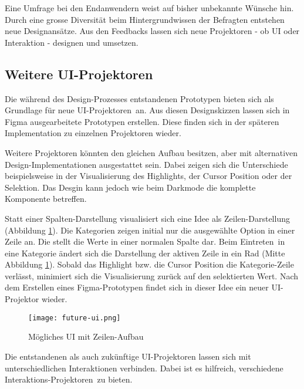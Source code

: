 Eine Umfrage bei den Endanwendern weist auf bisher unbekannte Wünsche hin. 
Durch eine grosse Diversität beim Hintergrundwissen der Befragten entstehen neue Designansätze.
Aus den Feedbacks lassen sich neue Projektoren - ob UI oder Interaktion - designen und umsetzen.


\subsection{Weitere UI-Projektoren}
\label{sec:moreUi}

Die während des Design-Prozesses entstandenen Prototypen bieten sich als Grundlage für neue UI-Projektoren\footnotemark \ an.
Aus diesen Designskizzen lassen sich in Figma ausgearbeitete Prototypen erstellen.
Diese finden sich in der späteren Implementation zu einzelnen Projektoren wieder.

Weitere Projektoren könnten den gleichen Aufbau besitzen, aber mit alternativen Design-Implementationen ausgestattet sein.
Dabei zeigen sich die Unterschiede beispielsweise in der Visualisierung des Highlights, der Cursor Position oder der Selektion.
Das Desgin kann jedoch wie beim Darkmode die komplette Komponente betreffen.

Statt einer Spalten-Darstellung visualisiert sich eine Idee als Zeilen-Darstellung (Abbildung \ref{img:futureUi}). 
Die Kategorien zeigen initial nur die ausgewählte Option in einer Zeile an.
Die  stellt die Werte in einer normalen Spalte dar.
Beim Eintreten\footnotemark \ in eine Kategorie ändert sich die Darstellung der aktiven Zeile in ein Rad (Mitte Abbildung \ref{img:futureUi}).
Sobald das Highlight bzw. die Cursor Position die Kategorie-Zeile verlässt, minimiert sich die Visualisierung zurück auf den selektierten Wert.
Nach dem Erstellen eines Figma-Prototypen findet sich in dieser Idee ein neuer UI-Projektor wieder.

\begin{figure}[!htb]
    \centering
    \texttt{[image: future-ui.png]}
    \caption{Mögliches UI mit Zeilen-Aufbau}
    \label{img:futureUi}
\end{figure}

Die entstandenen als auch zukünftige UI-Projektoren lassen sich mit unterschiedlichen Interaktionen verbinden.
Dabei ist es hilfreich, verschiedene Interaktions-Projektoren\footnotemark \ zu bieten.


